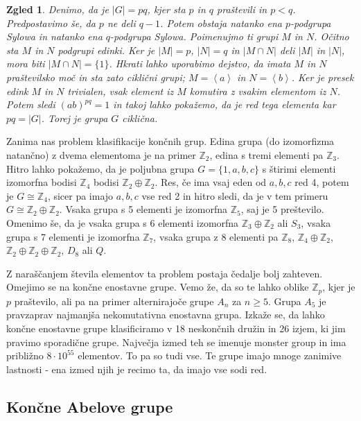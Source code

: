 \documentclass[10pt, a4paper]{article}
\newtheorem{zgled}{Zgled}[section]
\newcommand{\Z}{\mathbb {Z}}
\newcommand{\gen}[1]{\left\langle #1 \right\rangle}
\begin{document}
\begin{zgled}
  Denimo, da je $|G| = pq$, kjer sta $p$ in $q$ praštevili in $p < q$.
  Predpostavimo še, da $p$ ne deli $q - 1$.
  Potem obstaja natanko ena $p$-podgrupa Sylowa in natanko ena $q$-podgrupa Sylowa.
  Poimenujmo ti grupi $M$ in $N$. Očitno sta $M$ in $N$ podgrupi edinki.
  Ker je $|M| = p$, $|N| = q$ in $|M \cap N|$ deli $|M|$ in $|N|$,
  mora biti $|M \cap N| = \{1\}$.
  Hkrati lahko uporabimo dejstvo, da imata $M$ in $N$ praštevilsko moč in 
  sta zato ciklični grupi; $M = \gen{a}$ in $N = \gen{b}$.
  Ker je presek edink $M$ in $N$ trivialen, vsak element iz $M$ komutira z vsakim elementom iz $N$.
  Potem sledi $(ab)^{pq} = 1$ in takoj lahko pokažemo, da je red tega elementa kar $pq = |G|$.
  Torej je grupa $G$ ciklična.
\end{zgled}

  Zanima nas problem klasifikacije končnih grup.
  Edina grupa (do izomorfizma natančno) z dvema elementoma je na primer $\Z_2$,
  edina s tremi elementi pa $\Z_3$. Hitro lahko pokažemo, da je poljubna grupa 
  $G = \{1, a, b, c\}$ s štirimi elementi izomorfna bodisi $\Z_4$ bodisi $\Z_2 \oplus \Z_2$.
  Res, če ima vsaj eden od $a, b, c$ red 4, potem je $G \cong \Z_4$,
  sicer pa imajo $a, b, c$ vse red 2 in hitro sledi, da je v tem primeru $G \cong \Z_2 \oplus \Z_2.$
  Vsaka grupa s 5 elementi je izomorfna $\Z_5$, saj je 5 preštevilo.
  Omenimo še, da je vsaka grupa s 6 elementi izomorfna $\Z_3 \oplus \Z_2$
  ali $S_3$, vsaka grupa s 7 elementi je izomorfna $\Z_7$,
  vsaka grupa z 8 elementi pa $\Z_8$, $\Z_4 \oplus \Z_2$, $\Z_2 \oplus \Z_2 \oplus \Z_2$,
  $D_8$ ali $Q$.

  Z naraščanjem števila elementov ta problem postaja čedalje bolj zahteven.
  Omejimo se na končne enostavne grupe. Vemo že, da so te lahko oblike 
  $\Z_p$, kjer je $p$ praštevilo, ali pa na primer alternirajoče grupe $A_n$ za $n \geq 5$.
  Grupa $A_5$ je pravzaprav najmanjša nekomutativna enostavna grupa.
  Izkaže se, da lahko končne enostavne grupe klasificiramo v 18 neskončnih družin 
  in 26 izjem, ki jim pravimo sporadične grupe. Največja izmed teh se imenuje monster group
  in ima približno $8 \cdot 10^{55}$ elementov. To pa so tudi vse.
  Te grupe imajo mnoge zanimive lastnosti - ena izmed njih je recimo ta,
  da imajo vse sodi red.

\subsection{Končne Abelove grupe}
\end{document}
